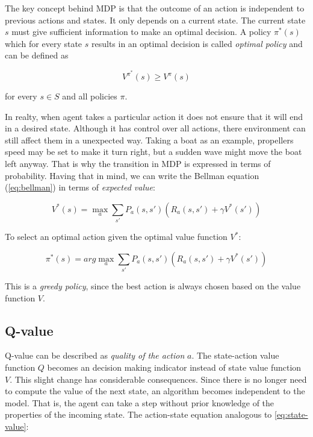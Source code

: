 The key concept behind MDP is that the outcome of an action is independent to previous actions and states. It only depends on a current state. The current state $s$ must give sufficient information to make an optimal decision. A policy $\pi^{*}(s)$ which for every state $s$ results in an optimal decision is called \emph{optimal policy} and can be defined as 

\begin{equation}
    V^{\pi^{*}}(s) \ge V^{\pi}(s)
\end{equation}

for every $s \in S$ and all policies $\pi$.

In realty, when agent takes a particular action it does not ensure that it will end in a desired state. Although it has control over all actions, there environment can still affect them in a unexpected way. Taking a boat as an example, propellers speed may be set to make it turn right, but a sudden wave might move the boat left anyway. That is why the transition in MDP is expressed in terms of probability. Having that in mind, we can write the Bellman equation (\ref{eq:bellman}) in terms of \emph{expected value}:

\begin{equation}
    V^{*}(s) = \max_a \sum_{s'} P_a(s, s') \left(R_a(s, s') + \gamma V^{*}(s') \right)
\label{eq:state-value}
\end{equation}

To select an optimal action given the optimal value function $V^{*}$:

\begin{equation}
    \pi^{*}(s) = arg \max_a \sum_{s'} P_a(s, s') \left(R_a(s, s') + \gamma V^{*}(s') \right)
\label{eq:state-value-policy}
\end{equation}

This is a \emph{greedy policy}, since the best action is always chosen based on the value function $V$.

\subsection{Q-value}
\label{sub:q-val}

Q-value can be described as \emph{quality of the action} $a$. The state-action value function $Q$ becomes an decision making indicator instead of state value function $V$. This slight change has considerable consequences. Since there is no longer need to compute the value of the next state, an algorithm becomes independent to the model. That is, the agent can take a step without prior knowledge of the properties of the incoming state. The action-state equation analogous to \ref{eq:state-value}:

